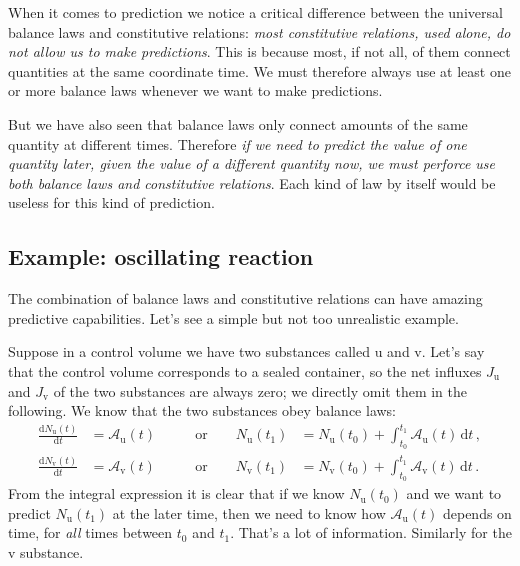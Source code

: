 \documentclass[a4paper,12pt,%
onecolumn,oneside,%
british%
]{memoir}
\newcommand*{\di}{\mathrm{d}}%
\renewcommand*{\|}[1][]{\nonscript\:#1\vert\nonscript\:\mathopen{}}
\newcommand*{\yti}{t_{0}}
\newcommand*{\ytf}{t_{1}}
\newcommand*{\dt}{\di t}
\newcommand*{\yN}{N}
\newcommand*{\yJ}{J}
\newcommand*{\ya}{\mathcal{A}}
\newcommand*{\yNu}{\yN_{\text{u}}}
\newcommand*{\yNv}{\yN_{\text{v}}}
\newcommand*{\yJu}{\yJ_{\text{u}}}
\newcommand*{\yJv}{\yJ_{\text{v}}}
\newcommand*{\yau}{\ya_{\text{u}}}
\newcommand*{\yav}{\ya_{\text{v}}}
\begin{document}
When it comes to prediction we notice a critical difference between the universal balance laws and constitutive relations: \emph{most constitutive relations, used alone, do not allow us to make predictions}. This is because most, if not all, of them connect quantities at the same coordinate time. We must therefore always use at least one or more balance laws whenever we want to make predictions.

But we have also seen that balance laws only connect amounts of the same quantity at different times. Therefore \emph{if we need to predict the value of one quantity later, given the value of a different quantity now, we must perforce use both balance laws and constitutive relations}. Each kind of law by itself would be useless for this kind of prediction.

\subsection{Example: oscillating reaction}\label{sec:oscillating_reaction}

The combination of balance laws and constitutive relations can have amazing predictive capabilities. Let's see a simple but not too unrealistic example.

Suppose in a control volume we have two substances called $\mathrm{u}$ and $\mathrm{v}$. Let's say that the control volume corresponds to a sealed container, so the net influxes $\yJu$ and $\yJv$ of the two substances are always zero; we directly omit them in the following. We know that the two substances obey balance laws:
\begin{equation*}
  \begin{aligned}
    \frac{\di\yNu(t)}{\dt} &= \yau(t)
    &\qquad\text{or}\qquad
    \yNu(\ytf) &= \yNu(\yti) +
    \int_{\yti}^{\ytf}\!\!\yau(t)\,\dt \,,
    \\
    \frac{\di\yNv(t)}{\dt} &= \yav(t)
    &\qquad\text{or}\qquad
    \yNv(\ytf) &= \yNv(\yti) +
    \int_{\yti}^{\ytf}\!\!\yav(t)\,\dt \,.
  \end{aligned}
\end{equation*}
From the integral expression it is clear that if we know $\yNu(\yti)$ and we want to predict $\yNu(\ytf)$ at the later time, then we need to know how $\yau(t)$ depends on time, for \emph{all} times between $\yti$ and $\ytf$. That's a lot of information. Similarly for the $\mathrm{v}$ substance.
\end{document}
